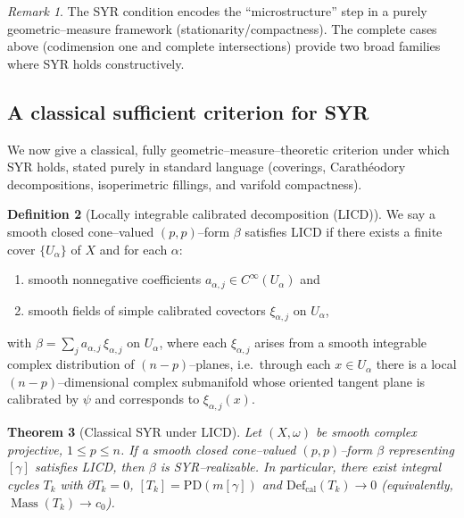\documentclass[11pt]{article}
\numberwithin{equation}{section}  %
\theoremstyle{plain}
\newtheorem{theorem}{Theorem}[section]
\theoremstyle{definition}
\newtheorem{definition}[theorem]{Definition}
\theoremstyle{remark}
\newtheorem{remark}[theorem]{Remark}
\DeclareMathOperator{\Mass}{Mass}
\newcommand{\Def}{\mathrm{Def}}
\begin{document}
\begin{remark}\label{rem:syr-remark}
	The SYR condition encodes the ``microstructure'' step in a purely geometric--measure
	framework (stationarity/compactness). The complete cases above (codimension
	one and complete intersections) provide two broad families where SYR holds
	constructively.
\end{remark}


\subsection*{A classical sufficient criterion for SYR}

We now give a classical, fully geometric--measure--theoretic criterion under which
SYR holds, stated purely in standard language (coverings, Carath\'eodory
decompositions, isoperimetric fillings, and varifold compactness).

\begin{definition}[Locally integrable calibrated decomposition (LICD)]
	We say a smooth closed cone--valued $(p,p)$--form $\beta$ satisfies LICD if there
	exists a finite cover $\{U_\alpha\}$ of $X$ and for each $\alpha$:
	\begin{enumerate}
		\item smooth nonnegative coefficients $a_{\alpha,j}\in C^\infty(U_\alpha)$ and
		\item smooth fields of simple calibrated covectors $\xi_{\alpha,j}$ on $U_\alpha$,
	\end{enumerate}
	with $\beta=\sum_j a_{\alpha,j}\,\xi_{\alpha,j}$ on $U_\alpha$, where each
	$\xi_{\alpha,j}$ arises from a smooth integrable complex distribution of
	$(n-p)$--planes, i.e.\ through each $x\in U_\alpha$ there is a local
	$(n-p)$--dimensional complex submanifold whose oriented tangent plane is calibrated
	by $\psi$ and corresponds to $\xi_{\alpha,j}(x)$.
\end{definition}

\begin{theorem}[Classical SYR under LICD]\label{thm:classical-syr-licd}
	Let $(X,\omega)$ be smooth complex projective, $1\le p\le n$. If a smooth closed
	cone--valued $(p,p)$--form $\beta$ representing $[\gamma]$ satisfies LICD, then $\beta$
	is SYR--realizable. In particular, there exist integral cycles $T_k$ with $\partial T_k=0$,
	$[T_k]=\mathrm{PD}(m[\gamma])$ and $\Def_{\mathrm{cal}}(T_k)\to 0$ (equivalently, $\Mass(T_k)\to c_0$).
\end{theorem}
\end{document}
